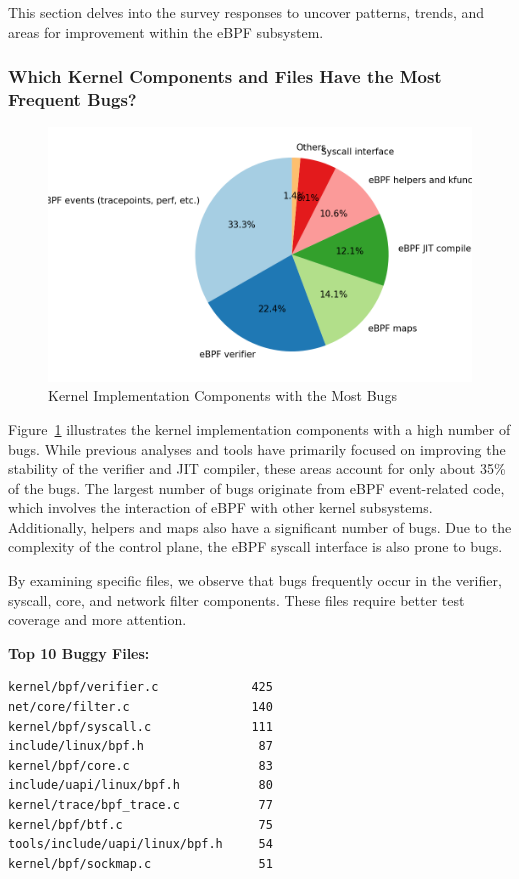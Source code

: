 This section delves into the survey responses to uncover patterns, trends, and areas for improvement within the eBPF subsystem.

\subsubsection{Which Kernel Components and Files Have the Most Frequent Bugs?}

\begin{figure}[ht]
    \centering
    \includegraphics[width=\linewidth]{feature-analysis/kernel_components_most_buggy_pie_chart.png}
    \caption{Kernel Implementation Components with the Most Bugs}
    \label{fig:buggy_kernel_component}
\end{figure}

Figure~\ref{fig:buggy_kernel_component} illustrates the kernel implementation components with a high number of bugs. While previous analyses and tools have primarily focused on improving the stability of the verifier and JIT compiler, these areas account for only about 35\% of the bugs. The largest number of bugs originate from eBPF event-related code, which involves the interaction of eBPF with other kernel subsystems. Additionally, helpers and maps also have a significant number of bugs. Due to the complexity of the control plane, the eBPF syscall interface is also prone to bugs.

By examining specific files, we observe that bugs frequently occur in the verifier, syscall, core, and network filter components. These files require better test coverage and more attention.

\textbf{Top 10 Buggy Files:}
\begin{verbatim}
kernel/bpf/verifier.c             425
net/core/filter.c                 140
kernel/bpf/syscall.c              111
include/linux/bpf.h                87
kernel/bpf/core.c                  83
include/uapi/linux/bpf.h           80
kernel/trace/bpf_trace.c           77
kernel/bpf/btf.c                   75
tools/include/uapi/linux/bpf.h     54
kernel/bpf/sockmap.c               51
\end{verbatim}

